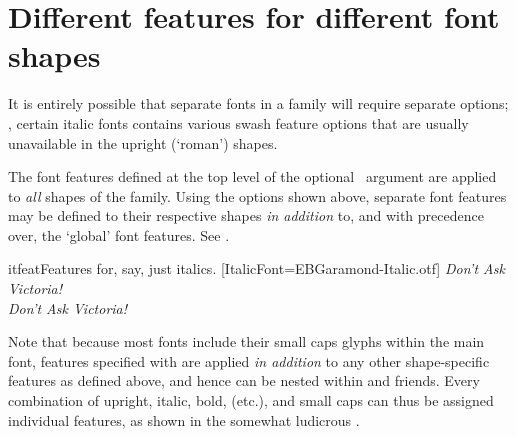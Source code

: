 \documentclass[a4paper]{l3doc}
\begin{document}
\section{Different features for different font shapes}
\label{sec:bfit-feat}


It is entirely possible that separate fonts in a family will require
separate options; \eg, certain italic fonts contains various swash
feature options that are usually unavailable in the upright (`roman') shapes.

The font features defined at the top level of the optional \cmd\fontspec\
argument are applied to \emph{all} shapes of the family.
Using the  options shown above,
separate font features may be defined to their respective shapes
\emph{in addition} to, and with precedence over, the `global' font features.
See \exref{itfeat}.

\begin{Xexample}{itfeat}{Features for, say, just italics.}
%
  [ItalicFont=EBGaramond-Italic.otf]
\itshape Don’t Ask Victoria! \\
Don’t Ask Victoria! \\
\end{Xexample}

Note that because most fonts include their small caps glyphs
within the main font, features specified with  are applied \emph{in addition} to
any other shape-specific features as defined above, and hence \feat{SmallCapsFeatures}
can be nested within \feat{ItalicFeatures} and friends. Every combination
of upright, italic, bold, (etc.), and small caps can thus be assigned individual
features, as shown in the somewhat ludicrous \exref{scfeat}.
\end{document}
